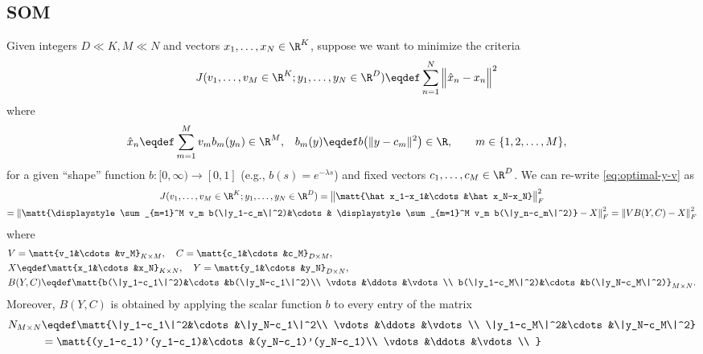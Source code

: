 \documentclass[11pt]{article}
\theoremstyle{remark}
\begin{document}
{\subsection{SOM}

Given integers $D\ll K,M\ll N$ and vectors $x_1,\dots,x_N\in\R^K$, suppose we want
to minimize the criteria
\begin{align}\label{eq:optimal-y-v}
  J(v_1,\dots,v_M\in\R^K; y_1,\dots,y_N\in\R^D)
  &\eqdef\sum_{n=1}^N \Big\| \hat x_n-x_n \Big\|^2
\end{align}
where
\begin{align*}
  \hat x_n&\eqdef  \sum_{m=1}^M v_m b_m(y_n)\in\R^M,&
  b_m(y)& \eqdef b\big(\|y-c_m\|^2\big)\in\R, \qquad m\in\{1,2,\dots,M\},
\end{align*}
for a given ``shape'' function $b:[0,\infty)\to[0,1]$ (e.g.,
$b(s)=e^{-\lambda s}$) and fixed vectors $c_1,\dots,c_M\in\R^D$. We can
re-write \eqref{eq:optimal-y-v} as 
\begin{multline}\label{eq:optimal-y-v}
  J(v_1,\dots,v_M\in\R^K; y_1,\dots,y_N\in\R^D)
  =\big\|\matt{\hat x_1-x_1&\cdots&\hat x_N-x_N}\big\|_F^2\\
  =\left\|  \matt{\displaystyle \sum_{m=1}^M v_m b(\|y_1-c_m\|^2)&\cdots& \displaystyle \sum_{m=1}^M v_m b(\|y_n-c_m\|^2)}-X\right\|_F^2
  =\left\| V B(Y,C)-X\right\|_F^2\\
\end{multline}
where
\begin{align*}
  &V=\matt{v_1&\cdots&v_M}_{K\times M}, \quad
  C=\matt{c_1&\cdots&c_M}_{D\times M}, \\
  &X\eqdef\matt{x_1&\cdots&x_N}_{K\times N}, \quad
  Y=\matt{y_1&\cdots&y_N}_{D\times N}, \\
  &B(Y,C)\eqdef\matt{b(\|y_1-c_1\|^2)&\cdots&b(\|y_N-c_1\|^2)\\
    \vdots&\ddots&\vdots\\
    b(\|y_1-c_M\|^2)&\cdots&b(\|y_N-c_M\|^2)}_{M\times N}.
\end{align*}
Moreover, $B(Y,C)$ is obtained by applying the scalar function $b$ to
every entry of the matrix
\begin{align*}
  N_{M\times N}&\eqdef \matt{\|y_1-c_1\|^2&\cdots&\|y_N-c_1\|^2\\
    \vdots&\ddots&\vdots\\
    \|y_1-c_M\|^2&\cdots&\|y_N-c_M\|^2}\\
  &=\matt{(y_1-c_1)'(y_1-c_1)&\cdots&(y_N-c_1)'(y_N-c_1)\\
    \vdots&\ddots&\vdots\\
}
\end{align*}}
\end{document}
